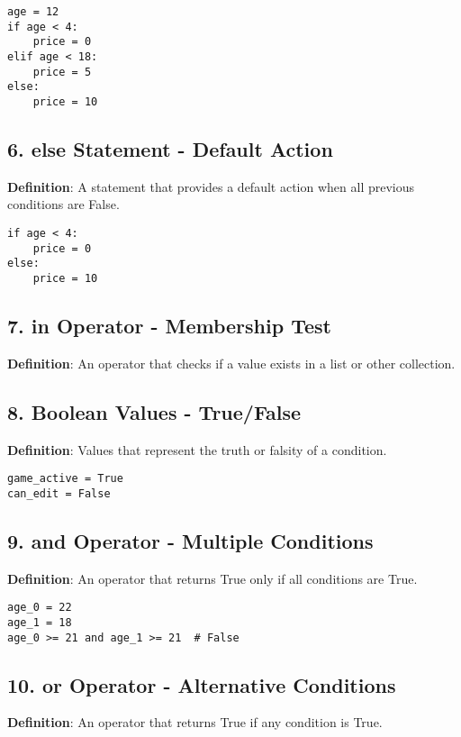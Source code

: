 \begin{lstlisting}
age = 12
if age < 4:
    price = 0
elif age < 18:
    price = 5
else:
    price = 10
\end{lstlisting}

\subsection*{6. else Statement - Default Action}
\textbf{Definition}: A statement that provides a default action when all previous conditions are False.

\begin{lstlisting}
if age < 4:
    price = 0
else:
    price = 10
\end{lstlisting}

\subsection*{7. in Operator - Membership Test}
\textbf{Definition}: An operator that checks if a value exists in a list or other collection.



\subsection*{8. Boolean Values - True/False}
\textbf{Definition}: Values that represent the truth or falsity of a condition.

\begin{lstlisting}
game_active = True
can_edit = False
\end{lstlisting}

\subsection*{9. and Operator - Multiple Conditions}
\textbf{Definition}: An operator that returns True only if all conditions are True.

\begin{lstlisting}
age_0 = 22
age_1 = 18
age_0 >= 21 and age_1 >= 21  # False
\end{lstlisting}

\subsection*{10. or Operator - Alternative Conditions}
\textbf{Definition}: An operator that returns True if any condition is True.

